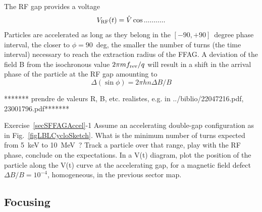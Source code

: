 The RF gap provides a voltage  
\begin{equation}
\label{EqRCyclo}
V_{\rm RF}(t) =\hat V \cos ........... 
\end{equation}
Particles are accelerated as long as they belong in the $[-90,+90]$~degree phase interval, 
the closer to $\phi=90$~deg, the smaller the number of turns 
(the time interval) necessary to reach the extraction radius of the FFAG.
A deviation of the field B from the isochronous value $2\pi m f_{\rm rev}/q$
will result in a  shift in the arrival phase of the particle at the RF gap amounting to 
\begin{equation}
\label{EqPFPhaseCyclo}
\Delta (\sin \phi) = 2\pi h n \Delta B/B
\end{equation}

 ******* prendre de valeurs R, B, etc. realistes, e.g. in ../biblio/22047216.pdf, 23001796.pdf*******

\smallskip
\noindent {\small $\bullet$} Exercise~\ref{secSFFAGAccel}-1 
Assume an accelerating double-gap  configuration as in Fig.~\ref{figLBLCycloSketch}. 
What is the minimum number of turns  expected  from 5~keV to 10~MeV~? Track a particle over that range, 
play with the RF phase, conclude on the  expectations. 
In a V(t) diagram, plot  the position  of the particle along the V(t) curve at the 
accelerating gap, for a magnetic field defect 
$\Delta B/B= 10^{-4}$, homogeneous, in the previous sector  map. 




\subsection{Focusing  \label{secSFFAGFocus}}

